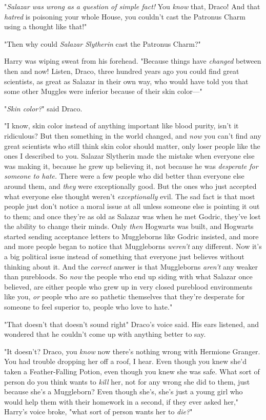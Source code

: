 "\emph{Salazar was wrong as a question of simple fact!} You \emph{know} that,
Draco! And that \emph{hatred} is poisoning your whole House, you couldn't cast
the Patronus Charm using a thought like that!"

"Then why could \emph{Salazar Slytherin} cast the Patronus Charm?"

Harry was wiping sweat from his forehead. "Because things have \emph{changed}
between then and now! Listen, Draco, three hundred years ago you could find
great scientists, as great as Salazar in their own way, who would have told you
that some other Muggles were inferior because of their skin color\mbox{---}"

"\emph{Skin color?}" said Draco.

"I know, skin color instead of anything important like blood purity, isn't it
ridiculous? But then something in the world changed, and \emph{now} you can't
find any great scientists who still think skin color should matter, only loser
people like the ones I described to you. Salazar Slytherin made the mistake
when everyone else was making it, because he grew up believing it, not because
he was \emph{desperate for someone to hate.} There were a few people who did
better than everyone else around them, and \emph{they} were exceptionally good.
But the ones who just accepted what everyone else thought weren't
\emph{exceptionally} evil. The sad fact is that most people just don't notice a
moral issue at all unless someone else is pointing it out to them; and once
they're as old as Salazar was when he met Godric, they've lost the ability to
change their minds. Only \emph{then} Hogwarts was built, and Hogwarts started
sending acceptance letters to Muggleborns like Godric insisted, and more and
more people began to notice that Muggleborns \emph{weren't} any different. Now
it's a big political issue instead of something that everyone just believes
without thinking about it. And the \emph{correct} answer is that Muggleborns
\emph{aren't} any weaker than purebloods. So \emph{now} the people who end up
siding with what Salazar once believed, are either people who grew up in very
closed pureblood environments like you, \emph{or} people who are so pathetic
themselves that they're desperate for someone to feel superior to, people who
love to hate."

"That doesn't{\el} that doesn't sound right{\el}" Draco's voice said. His
ears listened, and wondered that he couldn't come up with anything better to
say.

"It doesn't? Draco, you \emph{know} now there's nothing wrong with Hermione
Granger. You had trouble dropping her off a roof, I hear. Even though you knew
she'd taken a Feather-Falling Potion, even though you knew she was safe. What
sort of person do you think wants to \emph{kill} her, not for any wrong she did
to them, just because she's a Muggleborn? Even though she's, she's just a young
girl who would help them with their homework in a second, if they ever asked
her," Harry's voice broke, "what sort of person wants her to \emph{die?}"

